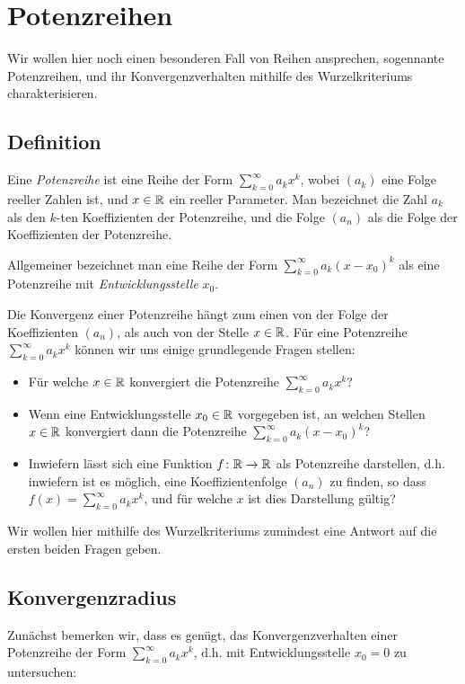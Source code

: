 \documentclass[a4paper,10pt]{article}
\begin{document}
\section{Potenzreihen}
Wir wollen hier noch einen besonderen Fall von Reihen ansprechen, sogennante Potenzreihen, und ihr Konvergenzverhalten mithilfe des Wurzelkriteriums charakterisieren.


\subsection{Definition}
\begin{defi}
 Eine \emph{Potenzreihe} ist eine Reihe der Form $\sum_{k=0}^\infty a_k x^k$, wobei $(a_k)$ eine Folge reeller Zahlen ist, und $x \in \mathbb{R}$ ein reeller Parameter. Man bezeichnet die Zahl $a_k$ als den $k$-ten Koeffizienten der Potenzreihe, und die Folge $(a_n)$ als die Folge der Koeffizienten der Potenzreihe.
 
 Allgemeiner bezeichnet man eine Reihe der Form $\sum_{k=0}^\infty a_k (x-x_0)^k$ als eine Potenzreihe mit \emph{Entwicklungsstelle} $x_0$.
\end{defi}


Die Konvergenz einer Potenzreihe hängt zum einen von der Folge der Koeffizienten $(a_n)$, als auch von der Stelle $x \in \mathbb{R}$. Für eine Potenzreihe $\sum_{k=0}^\infty a_k x^k$ können wir uns einige grundlegende Fragen stellen:
\begin{itemize}
 \item
  Für welche $x \in \mathbb{R}$ konvergiert die Potenzreihe $\sum_{k=0}^\infty a_k x^k$?
 \item
  Wenn eine Entwicklungsstelle $x_0 \in \mathbb{R}$ vorgegeben ist, an welchen Stellen $x \in \mathbb{R}$ konvergiert dann die Potenzreihe $\sum_{k=0}^\infty a_k (x-x_0)^k$?
 \item
  Inwiefern lässt sich eine Funktion $f \colon \mathbb{R} \to \mathbb{R}$ als Potenzreihe darstellen, d.h. inwiefern ist es möglich, eine Koeffizientenfolge $(a_n)$ zu finden, so dass $f(x) = \sum_{k=0}^\infty a_k x^k$, und für welche $x$ ist dies Darstellung gültig?
\end{itemize}


Wir wollen hier mithilfe des Wurzelkriteriums zumindest eine Antwort auf die ersten beiden Fragen geben.


\subsection{Konvergenzradius}
Zunächst bemerken wir, dass es genügt, das Konvergenzverhalten einer Potenzreihe der Form $\sum_{k=0}^\infty a_k x^k$, d.h. mit Entwicklungsstelle $x_0 = 0$ zu untersuchen:
\end{document}
